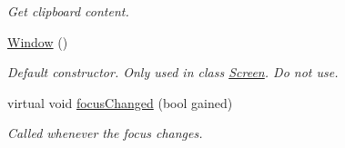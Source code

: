 \begin{DoxyCompactItemize}
\begin{DoxyCompactList}\small\item\em Get clipboard content. \end{DoxyCompactList}\item 
\hypertarget{classGUI_1_1Window_ae828e9daa964dfc65a3550fb03117d30}{\hyperlink{classGUI_1_1Window_ae828e9daa964dfc65a3550fb03117d30}{Window} ()}\label{classGUI_1_1Window_ae828e9daa964dfc65a3550fb03117d30}

\begin{DoxyCompactList}\small\item\em Default constructor. Only used in class \hyperlink{classGUI_1_1Screen}{Screen}. Do not use. \end{DoxyCompactList}\item 
\hypertarget{classGUI_1_1Window_a3b22f685994ee18bdbf3b2b5ff6cc27c}{virtual void \hyperlink{classGUI_1_1Window_a3b22f685994ee18bdbf3b2b5ff6cc27c}{focus\-Changed} (bool gained)}\label{classGUI_1_1Window_a3b22f685994ee18bdbf3b2b5ff6cc27c}

\begin{DoxyCompactList}\small\item\em Called whenever the focus changes. \end{DoxyCompactList}\end{DoxyCompactItemize}
